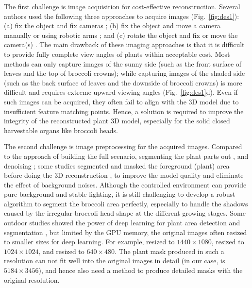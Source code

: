 The first challenge is image acquisition for cost-effective reconstruction. Several authors used the following three approaches to acquire images (Fig.~\ref{fig:des1}): (a) fix the object and fix cameras \citep{nguyen_structured_2015}; (b) fix the object and move a camera manually \citep{xiao_image-based_2020} or using robotic arms \citep{cao_quantifying_2019,nguyen_3d_2016}; and (c) rotate the object and fix or move the camera(s) \citep{kochi_3d_2018,gao_novel_2021}. The main drawback of these imaging approaches is that it is difficult to provide fully complete view angles of plants within acceptable cost. Most methods can only capture images of the sunny side (such as the front surface of leaves and the top of broccoli crowns); while capturing images of the shaded side (such as the back surface of leaves and the downside of broccoli crowns) is more difficult and requires extreme upward viewing angles (Fig.~\ref{fig:des1}d). Even if such images can be acquired, they often fail to align with the 3D model due to insufficient feature matching points. Hence, a solution is required to improve the integrity of the reconstructed plant 3D model, especially for the solid closed harvestable organs like broccoli heads.

The second challenge is image preprocessing for the acquired images. Compared to the approach of building the full scenario, segmenting the plant parts out \citep{ge_method_2019}, and denoising \citep{wu_mvs-pheno_2020}; some studies segmented and masked the foreground (plant) area before doing the 3D reconstruction \citep{nguyen_3d_2016,kochi_3d_2018}, to improve the model quality and eliminate the effect of background noises. Although the controlled environment can provide pure background and stable lighting, it is still challenging to develop a robust algorithm to segment the broccoli area perfectly, especially to handle the shadows caused by the irregular broccoli head shape at the different growing stages. Some outdoor studies showed the power of deep learning for plant area detection and segmentation \citep{zhou_monitoring_2020,blok_effect_2021,garcia_towards_2021}, but limited by the GPU memory, the original images often resized to smaller sizes for deep learning. For example, \citet{zhou_monitoring_2020} resized to $1440 \times 1080$, \citet{blok_effect_2021} resized to $1024 \times 1024$, and \citet{garcia_towards_2021} resized to $640 \times 480$. The plant mask produced in such a resolution can not fit well into the original images in detail (in our case, is $5184 \times 3456$), and hence also need a method to produce detailed masks with the original resolution.

